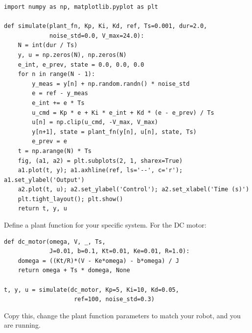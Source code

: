 \begin{verbatim}
import numpy as np, matplotlib.pyplot as plt

def simulate(plant_fn, Kp, Ki, Kd, ref, Ts=0.001, dur=2.0,
             noise_std=0.0, V_max=24.0):
    N = int(dur / Ts)
    y, u = np.zeros(N), np.zeros(N)
    e_int, e_prev, state = 0.0, 0.0, 0.0
    for n in range(N - 1):
        y_meas = y[n] + np.random.randn() * noise_std
        e = ref - y_meas
        e_int += e * Ts
        u_cmd = Kp * e + Ki * e_int + Kd * (e - e_prev) / Ts
        u[n] = np.clip(u_cmd, -V_max, V_max)
        y[n+1], state = plant_fn(y[n], u[n], state, Ts)
        e_prev = e
    t = np.arange(N) * Ts
    fig, (a1, a2) = plt.subplots(2, 1, sharex=True)
    a1.plot(t, y); a1.axhline(ref, ls='--', c='r'); a1.set_ylabel('Output')
    a2.plot(t, u); a2.set_ylabel('Control'); a2.set_xlabel('Time (s)')
    plt.tight_layout(); plt.show()
    return t, y, u
\end{verbatim}

Define a plant function for your specific system. For the DC motor:

\begin{verbatim}
def dc_motor(omega, V, _, Ts,
             J=0.01, b=0.1, Kt=0.01, Ke=0.01, R=1.0):
    domega = ((Kt/R)*(V - Ke*omega) - b*omega) / J
    return omega + Ts * domega, None

t, y, u = simulate(dc_motor, Kp=5, Ki=10, Kd=0.05,
                    ref=100, noise_std=0.3)
\end{verbatim}

Copy this, change the plant function parameters to match your robot, and you
are running.

